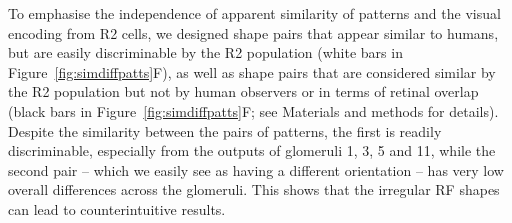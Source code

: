To emphasise the independence of apparent similarity of patterns and the visual encoding from R2 cells, we designed shape pairs that appear similar to humans, but are easily discriminable by the R2 population (white bars in Figure~\ref{fig:simdiffpatts}F), as well as shape pairs that are considered similar by the R2 population but not by human observers or in terms of retinal overlap (black bars in Figure~\ref{fig:simdiffpatts}F; see Materials and methods for details). Despite the similarity between the pairs of patterns, the first is readily discriminable, especially from the outputs of glomeruli 1, 3, 5 and 11, while the second pair – which we easily see as having a different orientation – has very low overall differences across the glomeruli. This shows that the irregular RF shapes can lead to counterintuitive results.


